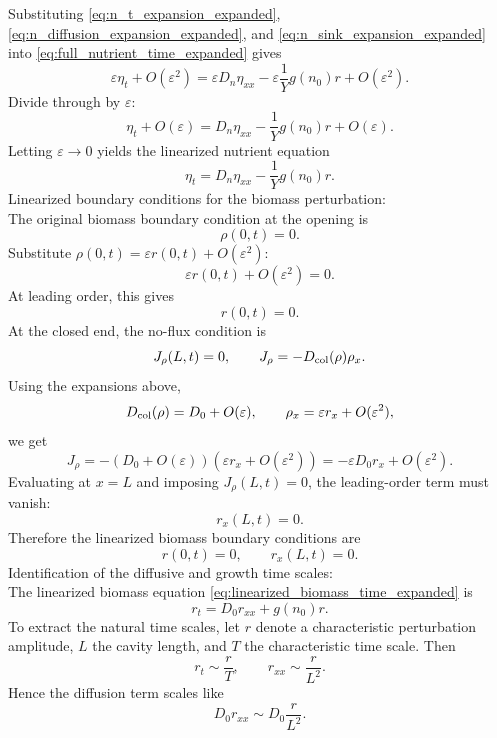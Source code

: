 \documentclass[11pt,a4paper]{report}
\begin{document}
	Substituting \eqref{eq:n_t_expansion_expanded}, \eqref{eq:n_diffusion_expansion_expanded}, and \eqref{eq:n_sink_expansion_expanded} into \eqref{eq:full_nutrient_time_expanded} gives
	\[
	\varepsilon \eta_t+O(\varepsilon^2)
	=
	\varepsilon D_n \eta_{xx}
	-
	\varepsilon \frac{1}{Y}g(n_0)r
	+
	O(\varepsilon^2).
	\]
	Divide through by $\varepsilon$:
	\[
	\eta_t+O(\varepsilon)
	=
	D_n \eta_{xx}
	-
	\frac{1}{Y}g(n_0)r
	+
	O(\varepsilon).
	\]
	Letting $\varepsilon\to 0$ yields the linearized nutrient equation
	\begin{equation}
		\eta_t
		=
		D_n \eta_{xx}
		-
		\frac{1}{Y}g(n_0)r.
		\label{eq:linearized_nutrient_time_expanded}
	\end{equation}
	Linearized boundary conditions for the biomass perturbation:\\
	The original biomass boundary condition at the opening is
	\[
	\rho(0,t)=0.
	\]
	Substitute $\rho(0,t)=\varepsilon r(0,t)+O(\varepsilon^2)$:
	\[
	\varepsilon r(0,t)+O(\varepsilon^2)=0.
	\]
	At leading order, this gives
	\begin{equation}
		r(0,t)=0.
		\label{eq:linearized_opening_bc_expanded}
	\end{equation}
	At the closed end, the no-flux condition is
	\[
	J_\rho(L,t)=0,
	\qquad
	J_\rho=-D_{\rm col}(\rho)\rho_x.
	\]
	Using the expansions above,
	\[
	D_{\rm col}(\rho)=D_0+O(\varepsilon),
	\qquad
	\rho_x=\varepsilon r_x+O(\varepsilon^2),
	\]
	we get
	\[
	J_\rho
	=
	-\left(D_0+O(\varepsilon)\right)\left(\varepsilon r_x+O(\varepsilon^2)\right)
	=
	-\varepsilon D_0 r_x+O(\varepsilon^2).
	\]
	Evaluating at $x=L$ and imposing $J_\rho(L,t)=0$, the leading-order term must vanish:
	\begin{equation}
		r_x(L,t)=0.
		\label{eq:linearized_closed_bc_expanded}
	\end{equation}
	Therefore the linearized biomass boundary conditions are
	\begin{equation}
		r(0,t)=0,
		\qquad
		r_x(L,t)=0.
		\label{eq:linearized_biomass_bcs_expanded}
	\end{equation}
	Identification of the diffusive and growth time scales:\\
	The linearized biomass equation \eqref{eq:linearized_biomass_time_expanded} is
	\[
	r_t=D_0 r_{xx}+g(n_0)r.
	\]
	To extract the natural time scales, let $r$ denote a characteristic perturbation amplitude, $L$ the cavity length, and $T$ the characteristic time scale.  Then
	\[
	r_t \sim \frac{r}{T},
	\qquad
	r_{xx}\sim \frac{r}{L^2}.
	\]
	Hence the diffusion term scales like
	\[
	D_0 r_{xx}\sim D_0\frac{r}{L^2}.
	\]
\end{document}
